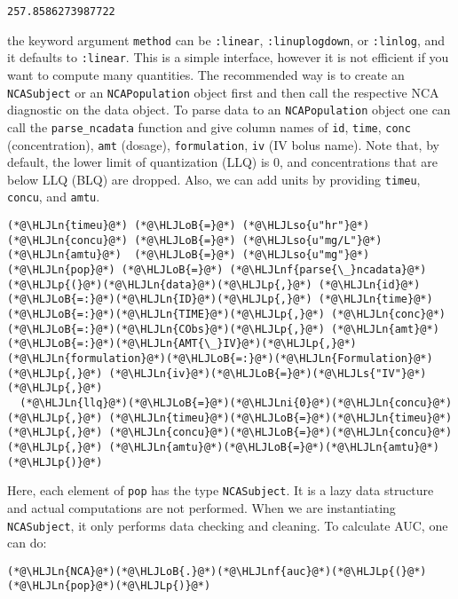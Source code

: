 \documentclass[12pt,a4paper]{article}
\newcommand{\HLJLn}[1]{#1}
\newcommand{\HLJLnf}[1]{\textcolor[RGB]{66,102,213}{#1}}
\newcommand{\HLJLs}[1]{\textcolor[RGB]{201,61,57}{#1}}
\newcommand{\HLJLso}[1]{\textcolor[RGB]{201,61,57}{#1}}
\newcommand{\HLJLni}[1]{\textcolor[RGB]{59,151,46}{#1}}
\newcommand{\HLJLoB}[1]{\textcolor[RGB]{102,102,102}{\textbf{#1}}}
\newcommand{\HLJLp}[1]{#1}
\begin{document}
\begin{lstlisting}
257.8586273987722
\end{lstlisting}


the keyword argument \texttt{method} can be \texttt{:linear}, \texttt{:linuplogdown}, or \texttt{:linlog}, and it defaults to \texttt{:linear}. This is a simple interface, however it is not efficient if you want to compute many quantities. The recommended way is to create an \texttt{NCASubject} or an \texttt{NCAPopulation} object first and then call the respective NCA diagnostic on the data object. To parse data to an \texttt{NCAPopulation} object one can call the \texttt{parse\_ncadata} function and give column names of \texttt{id}, \texttt{time}, \texttt{conc} (concentration), \texttt{amt} (dosage), \texttt{formulation}, \texttt{iv} (IV bolus name). Note that, by default, the lower limit of quantization (LLQ) is $0$, and concentrations that are below LLQ (BLQ) are dropped. Also, we can add units by providing \texttt{timeu}, \texttt{concu}, and \texttt{amtu}.


\begin{lstlisting}
(*@\HLJLn{timeu}@*) (*@\HLJLoB{=}@*) (*@\HLJLso{u"hr"}@*)
(*@\HLJLn{concu}@*) (*@\HLJLoB{=}@*) (*@\HLJLso{u"mg/L"}@*)
(*@\HLJLn{amtu}@*)  (*@\HLJLoB{=}@*) (*@\HLJLso{u"mg"}@*)
(*@\HLJLn{pop}@*) (*@\HLJLoB{=}@*) (*@\HLJLnf{parse{\_}ncadata}@*)(*@\HLJLp{(}@*)(*@\HLJLn{data}@*)(*@\HLJLp{,}@*) (*@\HLJLn{id}@*)(*@\HLJLoB{=:}@*)(*@\HLJLn{ID}@*)(*@\HLJLp{,}@*) (*@\HLJLn{time}@*)(*@\HLJLoB{=:}@*)(*@\HLJLn{TIME}@*)(*@\HLJLp{,}@*) (*@\HLJLn{conc}@*)(*@\HLJLoB{=:}@*)(*@\HLJLn{CObs}@*)(*@\HLJLp{,}@*) (*@\HLJLn{amt}@*)(*@\HLJLoB{=:}@*)(*@\HLJLn{AMT{\_}IV}@*)(*@\HLJLp{,}@*) (*@\HLJLn{formulation}@*)(*@\HLJLoB{=:}@*)(*@\HLJLn{Formulation}@*)(*@\HLJLp{,}@*) (*@\HLJLn{iv}@*)(*@\HLJLoB{=}@*)(*@\HLJLs{"IV"}@*)(*@\HLJLp{,}@*)
  (*@\HLJLn{llq}@*)(*@\HLJLoB{=}@*)(*@\HLJLni{0}@*)(*@\HLJLn{concu}@*)(*@\HLJLp{,}@*) (*@\HLJLn{timeu}@*)(*@\HLJLoB{=}@*)(*@\HLJLn{timeu}@*)(*@\HLJLp{,}@*) (*@\HLJLn{concu}@*)(*@\HLJLoB{=}@*)(*@\HLJLn{concu}@*)(*@\HLJLp{,}@*) (*@\HLJLn{amtu}@*)(*@\HLJLoB{=}@*)(*@\HLJLn{amtu}@*)(*@\HLJLp{)}@*)
\end{lstlisting}


Here, each element of \texttt{pop} has the type \texttt{NCASubject}. It is a lazy data structure and actual computations are not performed.  When we are instantiating \texttt{NCASubject}, it only performs data checking and cleaning. To calculate AUC, one can do:


\begin{lstlisting}
(*@\HLJLn{NCA}@*)(*@\HLJLoB{.}@*)(*@\HLJLnf{auc}@*)(*@\HLJLp{(}@*)(*@\HLJLn{pop}@*)(*@\HLJLp{)}@*)
\end{lstlisting}
\end{document}
